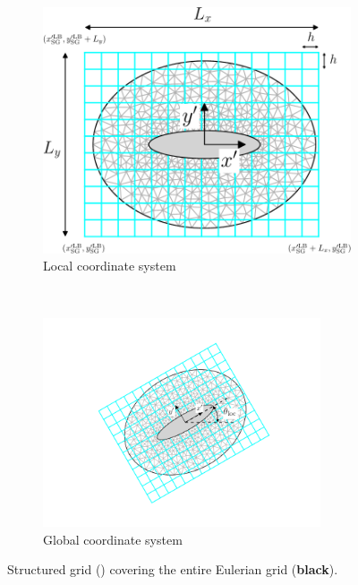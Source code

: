 		\begin{figure}[!b]
	     \centering
	     \begin{subfigure}[t]{0.45\textwidth}
	             \includegraphics[width=\textwidth]{./figures/coupling/interpolateVorticity/structuredGrid_localCoord-crop.pdf}
	             \caption{Local coordinate system}
	             \label{fig:structuredGrid_localCoord}
	     \end{subfigure}%
	     ~ %
	     \begin{subfigure}[t]{0.45\textwidth}
	             \includegraphics[trim = 40mm 15mm 35mm 15mm, clip,width=0.9\textwidth]{./figures/coupling/interpolateVorticity/structuredGrid_globCoor.png}
	             \caption{Global coordinate system}
	             \label{fig:structuredGrid_globCoor}
	     \end{subfigure}
	     
	     \caption{Structured grid ({}) covering the entire Eulerian grid (\textbf{black}).}
	     \label{fig:structuredGrid_Def}
		\end{figure}

